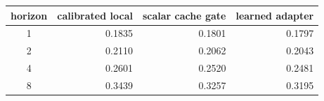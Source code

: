 \begin{tabular}{@{}crrr@{}}
\toprule
horizon & calibrated local & scalar cache gate & learned adapter \\
\midrule
1 & 0.1835 & 0.1801 & 0.1797 \\
2 & 0.2110 & 0.2062 & 0.2043 \\
4 & 0.2601 & 0.2520 & 0.2481 \\
8 & 0.3439 & 0.3257 & 0.3195 \\
\bottomrule
\end{tabular}
